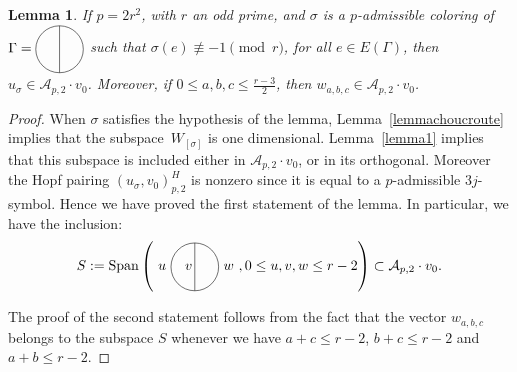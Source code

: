 \documentclass[pdftex]{sigma}
\numberwithin{equation}{section}
\newtheorem{Lemma}[Theorem]{Lemma}
\begin{document}
\begin{Lemma}\label{lemma3}If $p=2r^2$, with $r$ an odd prime, and $\sigma$ is a $p$-admissible coloring of $\Gamma=\Thetagraph$ such that $\sigma(e) \not\equiv -1 \pmod{r}$, for all $e\in E(\Gamma)$, then $u_{\sigma}\in \mathcal{A}_{p,2}\cdot v_0$. Moreover, if $0\leq a,b,c \leq \frac{r-3}{2}$, then $w_{a,b,c}\in \mathcal{A}_{p,2}\cdot v_0$.
\end{Lemma}

\begin{proof} When $\sigma$ satisfies the hypothesis of the lemma, Lemma~\ref{lemmachoucroute} implies that the sub\-spa\-ce~$W_{[\sigma]}$ is one dimensional. Lemma~\ref{lemma1} implies that this subspace is included either in $\mathcal{A}_{p,2}\cdot v_0$, or in its orthogonal. Moreover the Hopf pairing $\left( u_{\sigma}, v_0 \right)^H_{p,2}$ is nonzero since it is equal to a $p$-admissible $3j$-symbol. Hence we have proved the first statement of the lemma. In particular, we have the inclusion:
\begin{gather*} S:=\Span \left(\thetagraph{$u$}{$v$}{$w$}, 0\leq u,v,w \leq r-2 \right) \subset \mathcal{A}_{p,2}\cdot v_0.\end{gather*}

The proof of the second statement follows from the fact that the vector $w_{a,b,c}$ belongs to the subspace $S$ whenever we have $a+c\leq r-2$, $b+c\leq r-2$ and $a+b\leq r-2$.
\end{proof}
\end{document}
